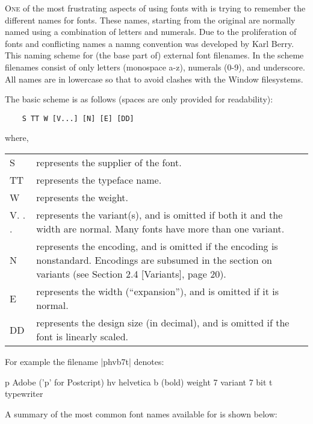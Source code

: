 \setlength{\columnsep}{2em}
\begin{multicols}{2}
\lettrine{O}{ne} of the most frustrating aspects of using fonts with \latex is trying to remember the different names for fonts. These names, starting from the original \tex are normally named using a combination of letters and numerals. Due to the proliferation of fonts and conflicting names a namng convention was developed by Karl Berry. This naming scheme for (the base part of) external \tex font filenames. In the scheme filenames
consist of only letters (monospace a-z), numerals (0-9), and underscore. All names are in lowercase so that to avoid clashes with the Window filesystems.

The basic scheme is as follows (spaces are only provided for readability):

\begin{Verbatim}
    S TT W [V...] [N] [E] [DD]
\end{Verbatim}

where,


\begin{tabular}{l p{5cm}}
S     &represents the supplier of the font.\\
TT    &represents the typeface name.\\
W     &represents the weight.\\
V. . .  &represents the variant(s), and is omitted if both it and the width are normal. Many fonts have more than one variant.\\
N &represents the encoding, and is omitted if the encoding is nonstandard. Encodings are subsumed in the section on variants (see Section 2.4 [Variants], page 20).\\
E &represents the width (“expansion”), and is omitted if it is normal.\\
DD &represents the design size (in decimal), and is omitted if the font is linearly
scaled.\\
\end{tabular}

For example the filename |phvb7t| denotes:

\begin{teX}
p    Adobe ('p' for Postcript)
hv  helvetica
b    (bold) weight
7   variant 7 bit
t   typewriter
\end{teX}

A summary of the most common font names available for \latex
is shown below:


\end{multicols}

